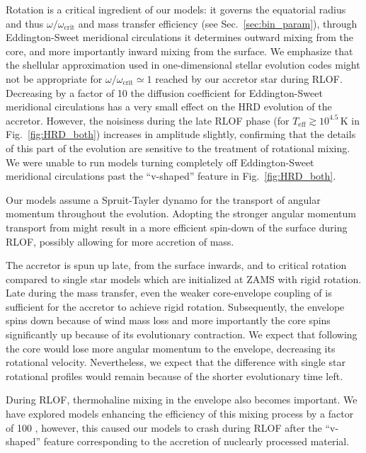\documentclass[twocolumn,twocolappendix,trackchanges]{aastex63}
\DeclareRobustCommand{\Figref}[1]{Fig.~\ref{#1}}
\DeclareRobustCommand{\Secref}[1]{Sec.~\ref{#1}}
\begin{document}
Rotation is a critical ingredient of our models: it governs the
equatorial radius and thus $\omega/\omega_\mathrm{crit}$
and mass transfer efficiency (see \Secref{sec:bin_param}), through
Eddington-Sweet meridional circulations it determines outward mixing
from the core, and more importantly inward mixing from the surface.
We emphasize that the shellular approximation used in one-dimensional
stellar evolution codes might not be appropriate for
$\omega/\omega_\mathrm{crit}\simeq 1$ reached by our accretor star
during RLOF. Decreasing by a factor of 10 the diffusion coefficient
for Eddington-Sweet meridional circulations has a very small effect on
the HRD evolution of the accretor. However, the noisiness during the
late RLOF phase (for $T_\mathrm{eff}\gtrsim10^{4.5}$\,K in
\Figref{fig:HRD_both}) increases in amplitude slightly, confirming
that the details of this part of the evolution are sensitive to the
treatment of rotational mixing. We were unable to run models turning
completely off Eddington-Sweet meridional circulations past the
``v-shaped'' feature in \Figref{fig:HRD_both}.

Our models assume a Spruit-Tayler dynamo \citep{spruit:02} for the
transport of angular momentum throughout the evolution. Adopting the
stronger angular momentum transport from \cite{fuller:19} might result
in a more efficient spin-down of the surface during RLOF, possibly
allowing for more accretion of mass.

The accretor is spun up late, from the surface inwards, and to
critical rotation compared to single star models which are initialized
at ZAMS with rigid rotation. Late during the mass transfer, even the
weaker core-envelope coupling of \cite{spruit:02} is sufficient for
the accretor to achieve rigid rotation. Subsequently, the envelope
spins down because of wind mass loss and more importantly the core
spins significantly up because of its evolutionary contraction. We
expect that following \cite{fuller:19} the core would lose more
angular momentum to the envelope, decreasing its rotational velocity.
Nevertheless, we expect that the difference with single star
rotational profiles would remain because of the shorter evolutionary time left.

During RLOF, thermohaline mixing in the envelope also becomes
important. We have explored models enhancing the efficiency of this
mixing process by a factor of 100 \citep{schootemeijer:19}, however, this caused our models to
crash during RLOF after the ``v-shaped'' feature corresponding to the
accretion of nuclearly processed material.
\end{document}
